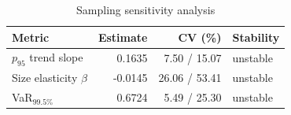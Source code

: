 \begin{table}[htbp]
\centering
\caption{Sampling sensitivity analysis}
\label{tab:sampling_sensitivity}
\begin{tabular}{lrrl}
\toprule
\textbf{Metric} & \textbf{Estimate} & \textbf{CV (\%)} & \textbf{Stability} \\
\midrule
$p_{95}$ trend slope & 0.1635 & 7.50 / 15.07 & unstable \\
Size elasticity $\beta$ & -0.0145 & 26.06 / 53.41 & unstable \\
VaR$_{99.5\%}$ & 0.6724 & 5.49 / 25.30 & unstable \\
\bottomrule
\end{tabular}
\end{table}
